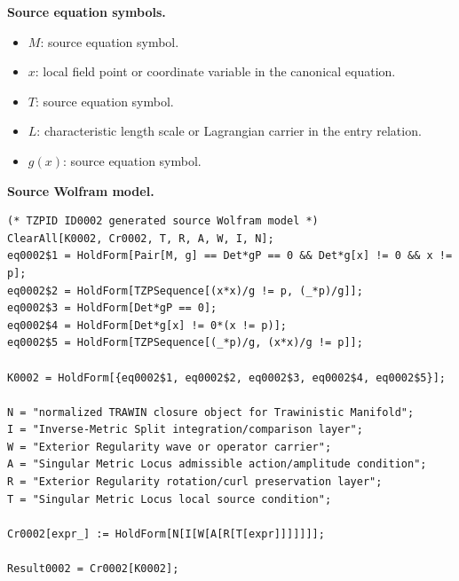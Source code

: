\begin{minipage}[t]{0.49\linewidth}
\begingroup
\small
\raggedright
\textbf{Source equation symbols.}\par
\begin{itemize}[leftmargin=1.35em,itemsep=1pt,topsep=1pt,parsep=0pt]
    \item $M$: source equation symbol.
    \item $x$: local field point or coordinate variable in the canonical equation.
    \item $T$: source equation symbol.
    \item $L$: characteristic length scale or Lagrangian carrier in the entry relation.
    \item $g(x)$: source equation symbol.
\end{itemize}
\endgroup
\end{minipage}\hfill
\begin{minipage}[t]{0.47\linewidth}
\begingroup
\scriptsize
\raggedright
\textbf{Source Wolfram model.}\par
\begin{Verbatim}[fontsize=\tiny,breaklines=true,breakanywhere=true]
(* TZPID ID0002 generated source Wolfram model *)
ClearAll[K0002, Cr0002, T, R, A, W, I, N];
eq0002$1 = HoldForm[Pair[M, g] == Det*gP == 0 && Det*g[x] != 0 && x != p];
eq0002$2 = HoldForm[TZPSequence[(x*x)/g != p, (_*p)/g]];
eq0002$3 = HoldForm[Det*gP == 0];
eq0002$4 = HoldForm[Det*g[x] != 0*(x != p)];
eq0002$5 = HoldForm[TZPSequence[(_*p)/g, (x*x)/g != p]];

K0002 = HoldForm[{eq0002$1, eq0002$2, eq0002$3, eq0002$4, eq0002$5}];

N = "normalized TRAWIN closure object for Trawinistic Manifold";
I = "Inverse-Metric Split integration/comparison layer";
W = "Exterior Regularity wave or operator carrier";
A = "Singular Metric Locus admissible action/amplitude condition";
R = "Exterior Regularity rotation/curl preservation layer";
T = "Singular Metric Locus local source condition";

Cr0002[expr_] := HoldForm[N[I[W[A[R[T[expr]]]]]]];

Result0002 = Cr0002[K0002];
\end{Verbatim}
\endgroup
\end{minipage}

